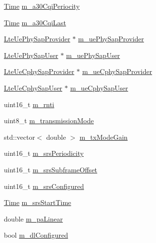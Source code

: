 \begin{DoxyCompactItemize}
\item 
\hyperlink{classns3_1_1Time}{Time} \hyperlink{classns3_1_1LteUePhy_a154d2c8025b353d563bf4ed40045536f}{m\+\_\+a30\+Cqi\+Periocity}
\item 
\hyperlink{classns3_1_1Time}{Time} \hyperlink{classns3_1_1LteUePhy_a912b9e3767497522b16d68e3602ec0a3}{m\+\_\+a30\+Cqi\+Last}
\item 
\hyperlink{classns3_1_1LteUePhySapProvider}{Lte\+Ue\+Phy\+Sap\+Provider} $\ast$ \hyperlink{classns3_1_1LteUePhy_a442bf9889ffb79723923619d182117e4}{m\+\_\+ue\+Phy\+Sap\+Provider}
\item 
\hyperlink{classns3_1_1LteUePhySapUser}{Lte\+Ue\+Phy\+Sap\+User} $\ast$ \hyperlink{classns3_1_1LteUePhy_a18ef57afea937e2e4bcc5b87bfd6ae68}{m\+\_\+ue\+Phy\+Sap\+User}
\item 
\hyperlink{classns3_1_1LteUeCphySapProvider}{Lte\+Ue\+Cphy\+Sap\+Provider} $\ast$ \hyperlink{classns3_1_1LteUePhy_a58ac2b271b70830c6b132a3805eb5ec9}{m\+\_\+ue\+Cphy\+Sap\+Provider}
\item 
\hyperlink{classns3_1_1LteUeCphySapUser}{Lte\+Ue\+Cphy\+Sap\+User} $\ast$ \hyperlink{classns3_1_1LteUePhy_aafa9d260efb47f9b0822814dc421a438}{m\+\_\+ue\+Cphy\+Sap\+User}
\item 
uint16\+\_\+t \hyperlink{classns3_1_1LteUePhy_a887b5dc4e246a308cd09127b64ed8fac}{m\+\_\+rnti}
\item 
uint8\+\_\+t \hyperlink{classns3_1_1LteUePhy_afdfda099de8075846985a04826875067}{m\+\_\+transmission\+Mode}
\item 
std\+::vector$<$ double $>$ \hyperlink{classns3_1_1LteUePhy_a6d82402117e8a661afd81304862df4c4}{m\+\_\+tx\+Mode\+Gain}
\item 
uint16\+\_\+t \hyperlink{classns3_1_1LteUePhy_a295824339c8549dc05048bc96b8a4c6e}{m\+\_\+srs\+Periodicity}
\item 
uint16\+\_\+t \hyperlink{classns3_1_1LteUePhy_a77622b44194738763420372573b7a176}{m\+\_\+srs\+Subframe\+Offset}
\item 
uint16\+\_\+t \hyperlink{classns3_1_1LteUePhy_a7dfdd1f166251b84e6c09f3a3544b37d}{m\+\_\+srs\+Configured}
\item 
\hyperlink{classns3_1_1Time}{Time} \hyperlink{classns3_1_1LteUePhy_a3089833b065ffedfcd904c9cbbae2797}{m\+\_\+srs\+Start\+Time}
\item 
double \hyperlink{classns3_1_1LteUePhy_ac0fbcaa87d4b06827890924c0189d9e6}{m\+\_\+pa\+Linear}
\item 
bool \hyperlink{classns3_1_1LteUePhy_a2ec4449da14656cfde833329523aa1bf}{m\+\_\+dl\+Configured}

\end{DoxyCompactItemize}
